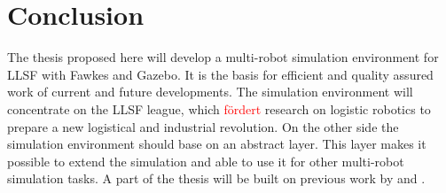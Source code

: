\documentclass[11pt,a4paper,titlepage]{article}
\begin{document}
\section{Conclusion}
The thesis proposed here will develop a multi-robot simulation environment for LLSF with Fawkes and Gazebo. It is the basis for efficient and quality assured work of current and future developments. The simulation environment will concentrate on the LLSF league, which \textcolor{red}{fördert} research on logistic robotics to prepare a new logistical and industrial revolution. On the other side the simulation environment should base on an abstract layer. This layer makes it possible to extend the simulation and able to use it for other multi-robot simulation tasks. A part of the thesis will be built on previous work by \cite{KlingenDA} and \cite{MultiLevelAbstraction}. 




\end{document}
